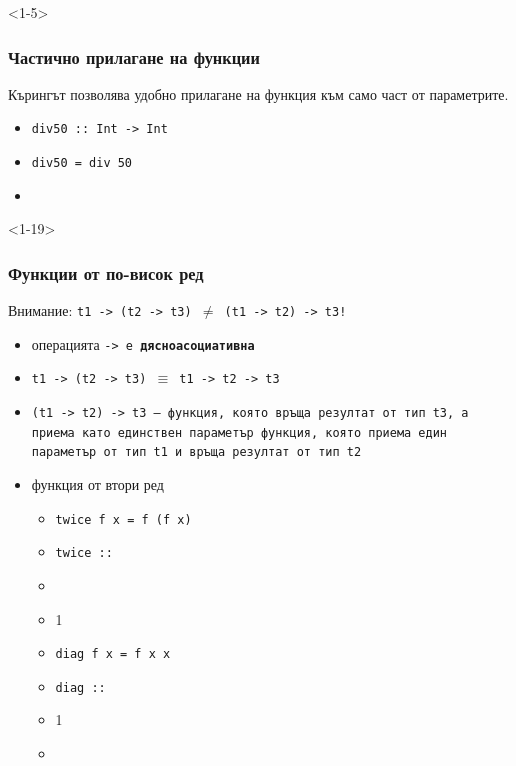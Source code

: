 \documentclass{beamer}
\begin{document}
\begin{frame}<1-5>
  \frametitle{Частично прилагане на функции}
  Кърингът позволява удобно прилагане на функция към само част от параметрите.
  \begin{itemize}[<+->]
  \item \tt{div50 :: Int -> Int}
  \item \tt{div50\temporal<4>{ x}{ $\not{\tt x}$}{} = div 50}
  \item {}
  \end{itemize}
\end{frame}

\begin{frame}<1-19>
  \frametitle{Функции от по-висок ред}
  \alert{Внимание:} \tt{t1 -> (t2 -> t3)} $\neq$ \tt{(t1 -> t2) -> t3}!\pause
  \begin{itemize}[<+->]
  \item операцията \tt{->} е \textbf{дясноасоциативна}
  \item \tt{t1 -> (t2 -> t3)} $\equiv$ \tt{t1 -> t2 -> t3}
  \item \tt{(t1 -> t2) -> t3} --- функция, която връща резултат от тип \tt{t3}, а приема като единствен параметър функция, която приема един параметър от тип \tt{t1} и връща резултат от тип \tt{t2}
  \item \alert{функция от втори ред}
    \begin{itemize}
    \item \tt{twice f x = f (f x)}
    \item \tt{twice :: }
    \item {}
    \item {}1\pause
    \item \tt{diag f x = f x x}
    \item \tt{diag :: }
    \item {}1
    \item {}
    \end{itemize}
  \end{itemize}
\end{frame}
\end{document}
